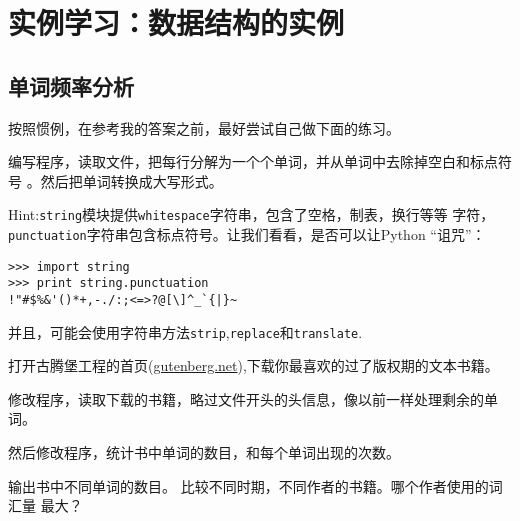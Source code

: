 \chapter{实例学习：数据结构的实例}

\section{单词频率分析}
\label{analysis}

按照惯例，在参考我的答案之前，最好尝试自己做下面的练习。

\begin{ex}
编写程序，读取文件，把每行分解为一个个单词，并从单词中去除掉空白和标点符号
。然后把单词转换成大写形式。


Hint:{\tt string}模块提供{\tt whitespace}字符串，包含了空格，制表，换行等等
字符，{\tt punctuation}字符串包含标点符号。让我们看看，是否可以让Python
“诅咒”：

\beforeverb
\begin{verbatim}
>>> import string
>>> print string.punctuation
!"#$%&'()*+,-./:;<=>?@[\]^_`{|}~
\end{verbatim}
\afterverb

并且，可能会使用字符串方法{\tt strip},{\tt replace}和{\tt translate}.


\end{ex}



\begin{ex}

打开古腾堡工程的首页(\url{gutenberg.net}),下载你最喜欢的过了版权期的文本书籍。


修改程序，读取下载的书籍，略过文件开头的头信息，像以前一样处理剩余的单词。

然后修改程序，统计书中单词的数目，和每个单词出现的次数。


输出书中不同单词的数目。 比较不同时期，不同作者的书籍。哪个作者使用的词汇量
最大？
\end{ex}

